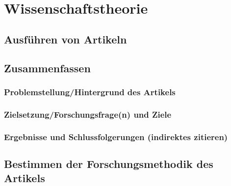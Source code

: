 \section{Wissenschaftstheorie}

\subsection{Ausführen von Artikeln}

\subsection{Zusammenfassen}
\subsubsection{Problemstellung/Hintergrund des Artikels}
\subsubsection{Zielsetzung/Forschungsfrage(n) und Ziele}
\subsubsection{Ergebnisse und Schlussfolgerungen (indirektes zitieren)}

\subsection{Bestimmen der Forschungsmethodik des Artikels}

\lipsum[1-2]